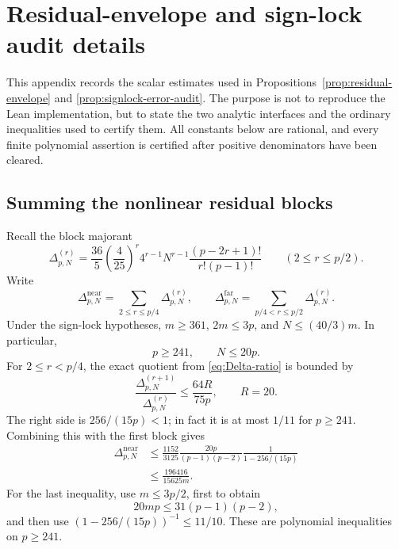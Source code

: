 \documentclass[11pt]{article}
\theoremstyle{definition}
\theoremstyle{remark}
\begin{document}
\appendix

\section{Residual-envelope and sign-lock audit details}
\label{app:signlock-audit}

This appendix records the scalar estimates used in
Propositions~\ref{prop:residual-envelope} and
\ref{prop:signlock-error-audit}.  The purpose is not to reproduce the Lean
implementation, but to state the two analytic interfaces and the ordinary
inequalities used to certify them.  All constants below are rational, and every finite
polynomial assertion is certified after positive denominators have been
cleared.

\subsection{Summing the nonlinear residual blocks}

Recall the block majorant
\[
 \Delta_{p,N}^{(r)}=
 \frac{36}{5}\left(\frac4{25}\right)^r4^{r-1}N^{r-1}
 \frac{(p-2r+1)!}{r!(p-1)!}
 \qquad(2\le r\le p/2).
\]
Write
\[
 \Delta^{\mathrm{near}}_{p,N}
   =\sum_{2\le r\le p/4}\Delta_{p,N}^{(r)},
 \qquad
 \Delta^{\mathrm{far}}_{p,N}
   =\sum_{p/4<r\le p/2}\Delta_{p,N}^{(r)}.
\]
Under the sign-lock hypotheses, $m\ge361$, $2m\le3p$, and
$N\le(40/3)m$.  In particular,
\begin{equation}\label{eq:audit-pN}
 p\ge241,
 \qquad N\le20p.
\end{equation}
For $2\le r<p/4$, the exact quotient from
\eqref{eq:Delta-ratio} is bounded by
\[
 \frac{\Delta_{p,N}^{(r+1)}}{\Delta_{p,N}^{(r)}}
 \le \frac{64R}{75p},
 \qquad R=20.
\]
The right side is $256/(15p)<1$; in fact it is at most $1/11$ for
$p\ge241$.  Combining this with the first block gives
\begin{align}
 \Delta^{\mathrm{near}}_{p,N}
 &\le
 \frac{1152}{3125}\frac{20p}{(p-1)(p-2)}
 \frac1{1-256/(15p)}                                      \label{eq:audit-near-closed}\\
 &\le \frac{196416}{15625m}.                              \label{eq:audit-near-final}
\end{align}
For the last inequality, use $m\le3p/2$, first to obtain
\[
 20mp\le31(p-1)(p-2),
\]
and then use $(1-256/(15p))^{-1}\le11/10$.  These are
polynomial inequalities on $p\ge241$.
\end{document}
